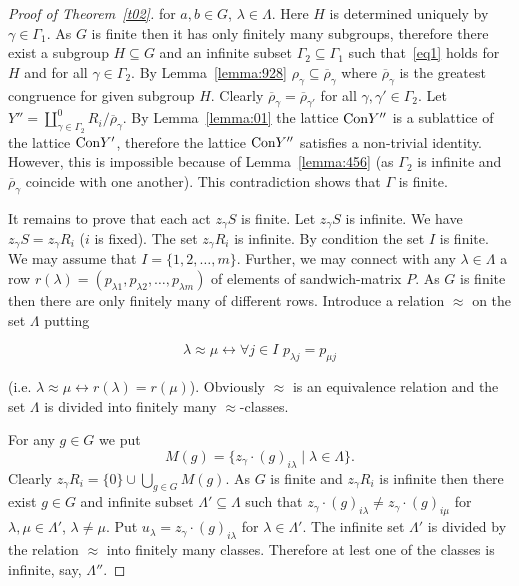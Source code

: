 \documentclass{birkau}
\numberwithin{equation}{section}
\theoremstyle{plain}
\theoremstyle{definition}
\begin{document}
\begin{proof}[Proof of Theorem~\ref{t02}]
        for $a,b\in G$, $\lambda \in \Lambda$. Here $H$ is determined uniquely by $\gamma \in \Gamma_1$. As $G$ is finite then it has only finitely many subgroups, therefore there exist a subgroup $H \subseteq G$ and an infinite subset $\Gamma_2 \subseteq \Gamma_1$ such that~\eqref{eq1} holds for $H$ and for all $\gamma \in \Gamma_2$. By Lemma~\ref{lemma:928} $\rho_\gamma \subseteq \overline \rho_\gamma$ where $\overline \rho_\gamma$ is the greatest congruence for given subgroup $H$. Clearly $\overline \rho_\gamma = \overline\rho_{\gamma'}$ for all $\gamma, \gamma' \in \Gamma_2$. Let $Y''= \coprod_{\gamma \in \Gamma_2}^0 R_i/{\overline \rho_\gamma}$. By Lemma~\ref{lemma:01} the lattice ${\rm Con}Y''$ is a sublattice of the lattice ${\rm Con}Y'$, therefore the lattice ${\rm Con}Y''$ satisfies a non-trivial identity. However, this is impossible because of Lemma~\ref{lemma:456} (as $\Gamma_2$ is infinite and $\overline\rho_\gamma$ coincide with one another). This contradiction shows that $\Gamma$ is finite.

        It remains to prove that each act $z_\gamma S$ is finite. Let $z_\gamma S$ is infinite. We have $z_\gamma S = z_\gamma R_i$ ($i$ is fixed). The set $z_\gamma R_i$ is infinite. By condition the set $I$ is finite. We may assume that $I=\{ 1,2, \ldots, m\}$. Further, we may connect with any $\lambda \in \Lambda$ a row $r(\lambda) = (p_{\lambda 1}, p_{\lambda 2}, \ldots, p_{\lambda m})$ of elements of sandwich-matrix $P$. As $G$ is finite then there are only finitely many of different rows. Introduce a relation $\approx$ on the set $\Lambda$ putting

        $$ \lambda \approx \mu \leftrightarrow \forall j\in I \,\, p_{\lambda j} = p_{\mu j} $$

        (i.e. $\lambda \approx \mu \leftrightarrow r(\lambda) = r(\mu)$). Obviously $\approx$ is an equivalence relation and the set $\Lambda$ is divided into finitely many ${\approx}$-classes.

        For any $g \in G$ we put $$ M(g)= \{ z_\gamma \cdot (g)_{i\lambda} \mid \lambda \in \Lambda \}.  $$ Clearly $z_\gamma R_i = \{0\} \cup \bigcup_{g\in G} M(g)$. As $G$ is finite and $z_\gamma R_i$ is infinite then there exist $g\in G$ and infinite subset $\Lambda' \subseteq \Lambda$ such that $z_\gamma \cdot (g)_{ i \lambda } \ne z_\gamma \cdot (g)_{ i \mu}$ for $\lambda, \mu \in \Lambda'$, $\lambda \ne \mu$. Put $u_\lambda=z_\gamma \cdot (g)_{i\lambda}$ for $\lambda \in \Lambda'$. The infinite set $\Lambda'$ is divided by the relation $\approx$ into finitely many classes. Therefore at lest one of the classes is infinite, say, $\Lambda''$.


\end{proof}
\end{document}
